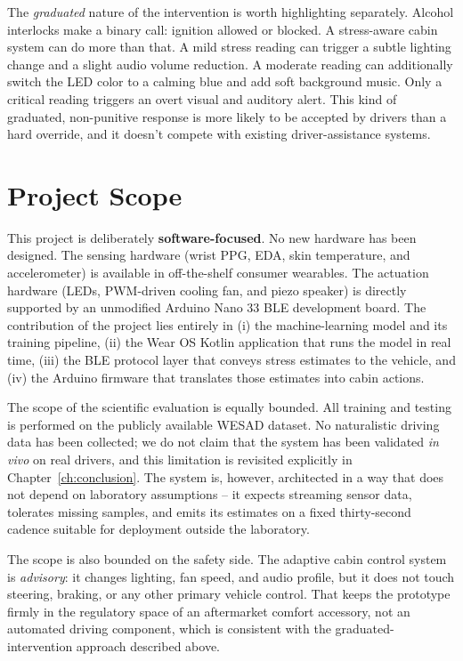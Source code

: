 The \emph{graduated} nature of the intervention is worth highlighting
separately. Alcohol interlocks make a binary call: ignition allowed or
blocked. A stress-aware cabin system can do more than that. A mild
stress reading can trigger a subtle lighting change and a slight audio
volume reduction. A moderate reading can additionally switch the LED
color to a calming blue and add soft background music. Only a critical
reading triggers an overt visual and auditory alert. This kind of
graduated, non-punitive response is more likely to be accepted by
drivers than a hard override, and it doesn't compete with existing
driver-assistance systems.

\section{Project Scope}
\label{sec:scope}

This project is deliberately \textbf{software-focused}. No new hardware
has been designed. The sensing hardware (wrist PPG, EDA, skin temperature,
and accelerometer) is available in off-the-shelf consumer wearables.
The actuation hardware (LEDs, PWM-driven cooling fan, and piezo speaker)
is directly supported by an unmodified Arduino Nano 33 BLE development
board. The contribution of the project lies
entirely in (i) the machine-learning model and its training pipeline,
(ii) the Wear OS Kotlin application that runs the model in real time,
(iii) the BLE protocol layer that conveys stress estimates to the
vehicle, and (iv) the Arduino firmware that translates those estimates
into cabin actions.

The scope of the scientific evaluation is equally bounded. All training
and testing is performed on the publicly available WESAD dataset. No
naturalistic driving data has been collected; we do not claim that the
system has been validated \emph{in vivo} on real drivers, and this
limitation is revisited explicitly in Chapter~\ref{ch:conclusion}.
The system is, however, architected in a way that does not depend on
laboratory assumptions -- it expects streaming sensor data, tolerates
missing samples, and emits its estimates on a fixed thirty-second
cadence suitable for deployment outside the laboratory.

The scope is also bounded on the safety side. The adaptive cabin
control system is \emph{advisory}: it changes lighting, fan speed,
and audio profile, but it does not touch steering, braking, or any
other primary vehicle control. That keeps the prototype firmly in the
regulatory space of an aftermarket comfort accessory, not an automated
driving component, which is consistent with the graduated-intervention
approach described above.

